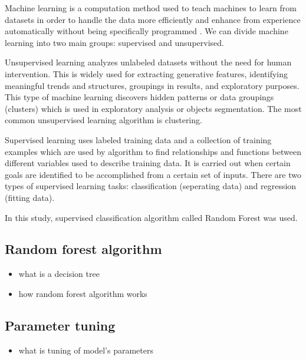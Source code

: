 \documentclass{amuthesis}
\begin{document}
Machine learning is a computation method used to teach machines to learn
from datasets in order to handle the data more efficiently and enhance
from experience automatically without being specifically programmed
\autocite{mahesh_machine_2018} \autocite{sarker_machine_2021}. We can
divide machine learning into two main groups: supervised and
unsupervised.

Unsupervised learning analyzes unlabeled datasets without the need for
human intervention. This is widely used for extracting generative
features, identifying meaningful trends and structures, groupings in
results, and exploratory purposes. \autocite{sarker_machine_2021} This
type of machine learning discovers hidden patterns or data groupings
(clusters) which is used in exploratory analysis or objects
segmentation. The most common unsupervised learning algorithm is
clustering.

Supervised learning uses labeled training data and a collection of
training examples which are used by algorithm to find relationships and
functions between different variables used to describe training data. It
is carried out when certain goals are identified to be accomplished from
a certain set of inputs. There are two types of supervised learning
tasks: classification (seperating data) and regression (fitting data).
\autocite{sarker_machine_2021}

In this study, supervised classification algorithm called Random Forest
was used.

\hypertarget{sec-rf}{%
\subsection{Random forest algorithm}\label{sec-rf}}

\begin{itemize}
\item
  what is a decision tree
\item
  how random forest algorithm works
\end{itemize}

\hypertarget{sec-tuning}{%
\subsection{Parameter tuning}\label{sec-tuning}}

\begin{itemize}
\tightlist
\item
  what is tuning of model's parameters
\end{itemize}
\end{document}
